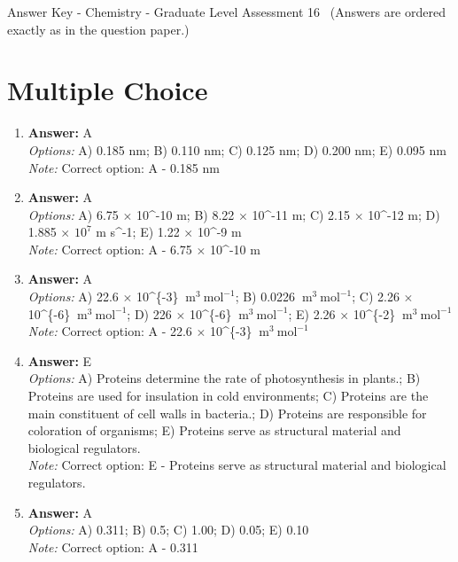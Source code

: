 \documentclass[12pt]{article}
\begin{document}
\begin{center}
Answer Key - Chemistry - Graduate Level Assessment 16 \
\small (Answers are ordered exactly as in the question paper.)
\end{center}

\section*{Multiple Choice}
\begin{enumerate}[label=\arabic*.]
\item \textbf{Answer:} A
\\ \textit{Options:} A) 0.185 $\mathrm{nm}$; B) 0.110 $\mathrm{nm}$; C) 0.125 $\mathrm{nm}$; D) 0.200 $\mathrm{nm}$; E) 0.095 $\mathrm{nm}$
\\ \textit{Note:} Correct option: A - 0.185 $\mathrm{nm}$
\item \textbf{Answer:} A
\\ \textit{Options:} A) 6.75 \ensuremath{\times} 10^-10 m; B) 8.22 \ensuremath{\times} 10^-11 m; C) 2.15 \ensuremath{\times} 10^-12 m; D) 1.885 \ensuremath{\times} $10^7$ m s^-1; E) 1.22 \ensuremath{\times} 10^-9 m
\\ \textit{Note:} Correct option: A - 6.75 \ensuremath{\times} 10^-10 m
\item \textbf{Answer:} A
\\ \textit{Options:} A) 22.6 \ensuremath{\times} 10^\{-3\} $\mathrm{~m}^3 \mathrm{~mol}^{-1}$; B) 0.0226 $\mathrm{~m}^3 \mathrm{~mol}^{-1}$; C) 2.26 \ensuremath{\times} 10^\{-6\} $\mathrm{~m}^3 \mathrm{~mol}^{-1}$; D) 226 \ensuremath{\times} 10^\{-6\} $\mathrm{~m}^3 \mathrm{~mol}^{-1}$; E) 2.26 \ensuremath{\times} 10^\{-2\} $\mathrm{~m}^3 \mathrm{~mol}^{-1}$
\\ \textit{Note:} Correct option: A - 22.6 \ensuremath{\times} 10^\{-3\} $\mathrm{~m}^3 \mathrm{~mol}^{-1}$
\item \textbf{Answer:} E
\\ \textit{Options:} A) Proteins determine the rate of photosynthesis in plants.; B) Proteins are used for insulation in cold environments; C) Proteins are the main constituent of cell walls in bacteria.; D) Proteins are responsible for coloration of organisms; E) Proteins serve as structural material and biological regulators.
\\ \textit{Note:} Correct option: E - Proteins serve as structural material and biological regulators.
\item \textbf{Answer:} A
\\ \textit{Options:} A) 0.311; B) 0.5; C) 1.00; D) 0.05; E) 0.10
\\ \textit{Note:} Correct option: A - 0.311
\end{enumerate}
\end{document}
